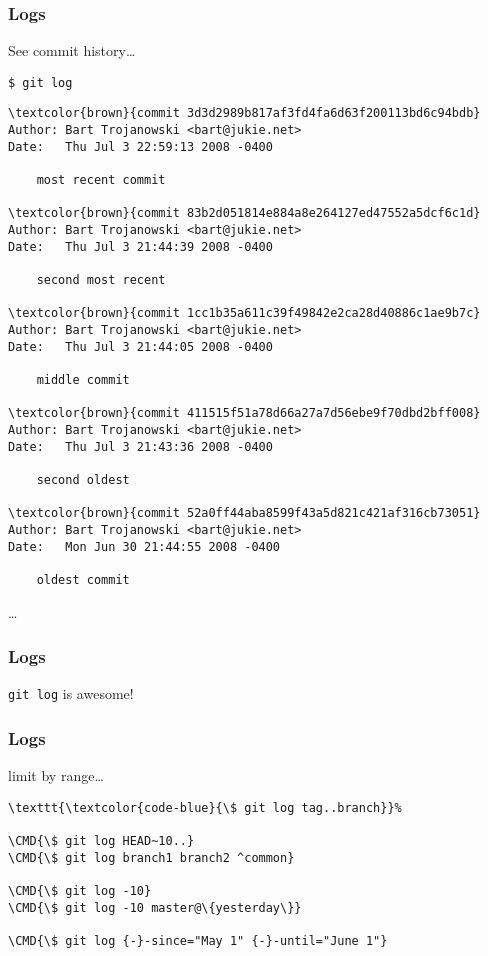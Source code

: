 \documentclass[english]{beamer}
\newcommand{\CMD}[1]{%
\texttt{\textcolor{code-blue}{#1}}%
}
\begin{document}
\begin{frame}[fragile]
\frametitle{Logs}

See commit history\ldots
\vspace{\baselineskip}

\CMD{\$ git log}
{\tiny
\begin{Verbatim}[commandchars=\\\{\}]
\textcolor{brown}{commit 3d3d2989b817af3fd4fa6d63f200113bd6c94bdb}
Author: Bart Trojanowski <bart@jukie.net>
Date:   Thu Jul 3 22:59:13 2008 -0400

    most recent commit

\textcolor{brown}{commit 83b2d051814e884a8e264127ed47552a5dcf6c1d}
Author: Bart Trojanowski <bart@jukie.net>
Date:   Thu Jul 3 21:44:39 2008 -0400

    second most recent

\textcolor{brown}{commit 1cc1b35a611c39f49842e2ca28d40886c1ae9b7c}
Author: Bart Trojanowski <bart@jukie.net>
Date:   Thu Jul 3 21:44:05 2008 -0400

    middle commit

\textcolor{brown}{commit 411515f51a78d66a27a7d56ebe9f70dbd2bff008}
Author: Bart Trojanowski <bart@jukie.net>
Date:   Thu Jul 3 21:43:36 2008 -0400

    second oldest

\textcolor{brown}{commit 52a0ff44aba8599f43a5d821c421af316cb73051}
Author: Bart Trojanowski <bart@jukie.net>
Date:   Mon Jun 30 21:44:55 2008 -0400

    oldest commit

\end{Verbatim}
}
\ldots
\vspace{\textheight}
\end{frame}

\begin{frame}
\frametitle{Logs}

\begin{center}
        \CMD{git log} is awesome!
\end{center}
\end{frame}

\begin{frame}[fragile]
\frametitle{Logs}

limit by range\ldots
\vspace{\baselineskip}

\begin{Verbatim}[commandchars=\\\{\}]
\CMD{\$ git log tag..branch}
\CMD{\$ git log HEAD~10..}
\CMD{\$ git log branch1 branch2 ^common}

\CMD{\$ git log -10}
\CMD{\$ git log -10 master@\{yesterday\}}

\CMD{\$ git log {-}-since="May 1" {-}-until="June 1"}
\end{Verbatim}

\vspace{\textheight}
\end{frame}
\end{document}
